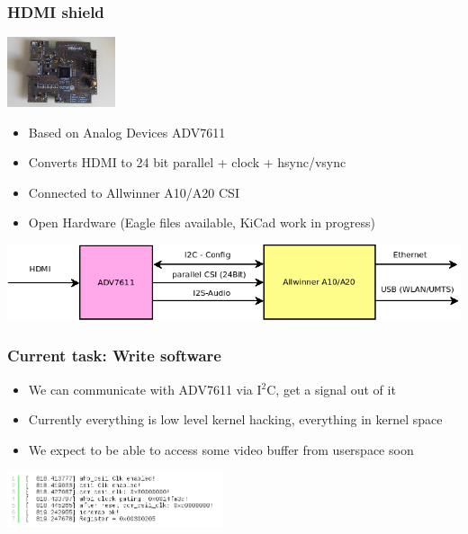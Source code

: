 \documentclass{beamer}
\begin{document}
\begin{frame} %

  \frametitle{HDMI shield}

  \begin{center}
    \includegraphics[width=120px]{shield.jpg}
  \end{center}

  \begin{itemize}
  \item Based on Analog Devices ADV7611
  \item Converts HDMI to 24 bit parallel + clock + hsync/vsync
  \item Connected to Allwinner A10/A20 CSI
  \item Open Hardware (Eagle files available, KiCad work in progress)
  \end{itemize}

  \begin{center}
    \includegraphics[width=\textwidth]{adv7611_a10.png}
  \end{center}

\end{frame}

\begin{frame} %

  \frametitle{Current task: Write software}
  \begin{itemize}
  \item We can communicate with ADV7611 via I$^2$C, get a signal out of it
  \item Currently everything is low level kernel hacking, everything in kernel space
  \item We expect to be able to access some video buffer from userspace soon
  \end{itemize}

  \begin{center}
    \includegraphics[width=240px]{dmesg.png}
  \end{center}

\end{frame}
\end{document}
